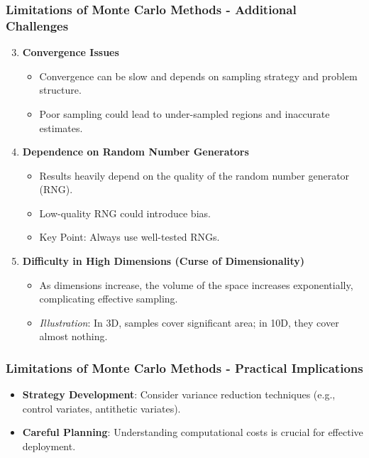 \documentclass[aspectratio=169]{beamer}
\begin{document}
\begin{frame}[fragile]
    \frametitle{Limitations of Monte Carlo Methods - Additional Challenges}
    \begin{enumerate}
        \setcounter{enumi}{2}
        \item \textbf{Convergence Issues}
            \begin{itemize}
                \item Convergence can be slow and depends on sampling strategy and problem structure.
                \item Poor sampling could lead to under-sampled regions and inaccurate estimates.
            \end{itemize}
        \item \textbf{Dependence on Random Number Generators}
            \begin{itemize}
                \item Results heavily depend on the quality of the random number generator (RNG).
                \item Low-quality RNG could introduce bias.
                \item Key Point: Always use well-tested RNGs.
            \end{itemize}
        \item \textbf{Difficulty in High Dimensions (Curse of Dimensionality)}
            \begin{itemize}
                \item As dimensions increase, the volume of the space increases exponentially, complicating effective sampling.
                \item \textit{Illustration}: In 3D, samples cover significant area; in 10D, they cover almost nothing.
            \end{itemize}
    \end{enumerate}
\end{frame}

\begin{frame}[fragile]
    \frametitle{Limitations of Monte Carlo Methods - Practical Implications}
    \begin{itemize}
        \item \textbf{Strategy Development}: Consider variance reduction techniques (e.g., control variates, antithetic variates).
        \item \textbf{Careful Planning}: Understanding computational costs is crucial for effective deployment.
    \end{itemize}
\end{frame}
\end{document}
